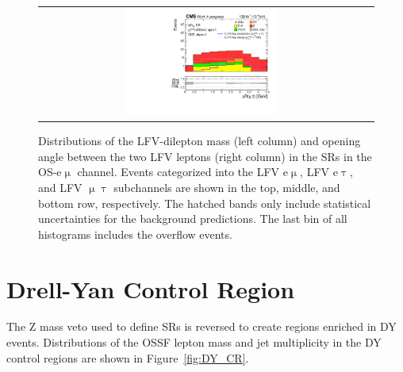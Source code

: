 \begin{figure}[tbh!]
\begin{center}
\begin{tabular}{cc}
 \includegraphics[width=0.48\textwidth]{figures/Part4/Evt/LFVmutaDr}\\
 \end{tabular}
 \caption{Distributions of the LFV-dilepton mass (left column) and opening angle between the two LFV leptons (right column) in the \acp{SR} in the \ac{OS}-e$\upmu$ channel. Events categorized into the LFV e$\upmu$, LFV e$\uptau$, and LFV $\upmu\uptau$ subchannels are shown in the top, middle, and bottom row, respectively. The hatched bands only include statistical uncertainties for the background predictions. The last bin of all histograms includes the overflow events.}
 \label{fig:LFVmass}
 \end{center}
 \end{figure}

\section{Drell-Yan Control Region}
\label{sec:DY_CR}

The Z mass veto used to define \acp{SR} is reversed to create regions enriched in \ac{DY} events. Distributions of the \ac{OSSF} lepton mass and jet multiplicity in the \ac{DY} control regions are shown in Figure~\ref{fig:DY_CR}.

